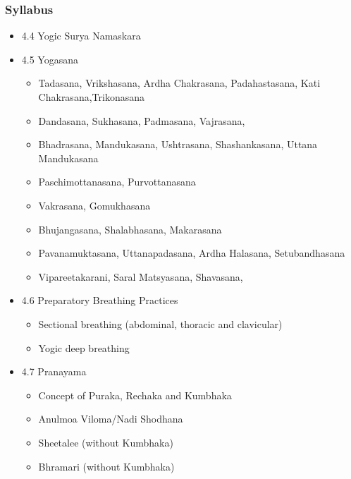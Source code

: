 \begin{frame}[fragile]\frametitle{Syllabus}

\begin{itemize}
\item 4.4  Yogic Surya Namaskara   
\item 4.5  Yogasana 
	\begin{itemize}
	\item Tadasana, Vrikshasana, Ardha Chakrasana, Padahastasana, Kati Chakrasana,Trikonasana  
	\item Dandasana, Sukhasana, Padmasana, Vajrasana, 
	\item Bhadrasana, Mandukasana, Ushtrasana, Shashankasana, Uttana Mandukasana 
	\item Paschimottanasana, Purvottanasana 
	\item Vakrasana, Gomukhasana 
	\item Bhujangasana, Shalabhasana, Makarasana 
	\item Pavanamuktasana, Uttanapadasana, Ardha Halasana, Setubandhasana 
	\item Vipareetakarani, Saral Matsyasana, Shavasana,  
	\end{itemize}

\item 4.6  Preparatory Breathing Practices   
	\begin{itemize}
	\item Sectional breathing (abdominal, thoracic and clavicular) 
	\item Yogic deep breathing 
	\end{itemize}
	
\item 4.7    Pranayama 
	\begin{itemize}
	\item Concept of Puraka, Rechaka and Kumbhaka 
	\item Anulmoa Viloma/Nadi Shodhana 
	\item Sheetalee (without Kumbhaka) 
	\item Bhramari (without Kumbhaka) 
	\end{itemize}
	
\end{itemize}
\end{frame}

